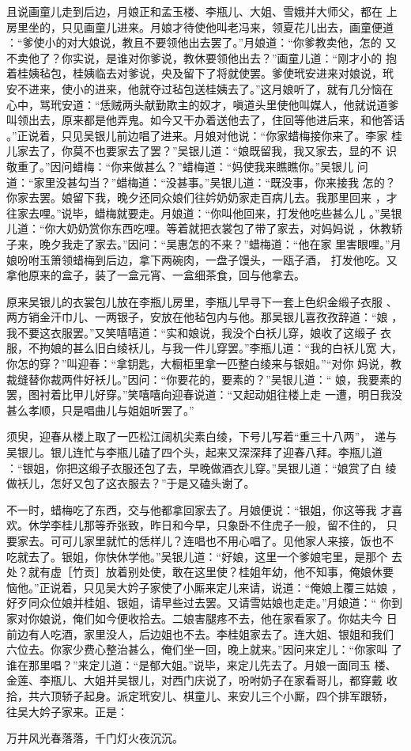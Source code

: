 且说画童儿走到后边，月娘正和孟玉楼、李瓶儿、大姐、雪娥并大师父，都在
上房里坐的，只见画童儿进来。月娘才待使他叫老冯来，领夏花儿出去，画童便道
：“爹使小的对大娘说，教且不要领他出去罢了。”月娘道：“你爹教卖他，怎的
又不卖他了？你实说，是谁对你爹说，教休要领他出去？”画童儿道：“刚才小的
抱着桂姨毡包，桂姨临去对爹说，央及留下了将就使罢。爹使玳安进来对娘说，玳
安不进来，使小的进来，他就夺过毡包送桂姨去了。”这月娘听了，就有几分恼在
心中，骂玳安道：“恁贼两头献勤欺主的奴才，嗔道头里使他叫媒人，他就说道爹
叫领出去，原来都是他弄鬼。如今又干办着送他去了，住回等他进后来，和他答话
。”正说着，只见吴银儿前边唱了进来。月娘对他说：“你家蜡梅接你来了。李家
桂儿家去了，你莫不也要家去了罢？”吴银儿道：“娘既留我，我又家去，显的不
识敬重了。”因问蜡梅：“你来做甚么？”蜡梅道：“妈使我来瞧瞧你。”吴银儿
问道：“家里没甚勾当？”蜡梅道：“没甚事。”吴银儿道：“既没事，你来接我
怎的？你家去罢。娘留下我，晚夕还同众娘们往妗奶奶家走百病儿去。我那里回来
，才往家去哩。”说毕，蜡梅就要走。月娘道：“你叫他回来，打发他吃些甚么儿
。”吴银儿道：“你大奶奶赏你东西吃哩。等着就把衣裳包了带了家去，对妈妈说
，休教轿子来，晚夕我走了家去。”因问：“吴惠怎的不来？”蜡梅道：“他在家
里害眼哩。”月娘吩咐玉箫领蜡梅到后边，拿下两碗肉，一盘子馒头，一瓯子酒，
打发他吃。又拿他原来的盒子，装了一盒元宵、一盒细茶食，回与他拿去。

原来吴银儿的衣裳包儿放在李瓶儿房里，李瓶儿早寻下一套上色织金缎子衣服
、两方销金汗巾儿、一两银子，安放在他毡包内与他。那吴银儿喜孜孜辞道：“娘
，我不要这衣服罢。”又笑嘻嘻道：“实和娘说，我没个白袄儿穿，娘收了这缎子
衣服，不拘娘的甚么旧白绫袄儿，与我一件儿穿罢。”李瓶儿道：“我的白袄儿宽
大，你怎的穿？”叫迎春：“拿钥匙，大橱柜里拿一匹整白绫来与银姐。”“对你
妈说，教裁缝替你裁两件好袄儿。”因问：“你要花的，要素的？”吴银儿道：“
娘，我要素的罢，图衬着比甲儿好穿。”笑嘻嘻向迎春说道：“又起动姐往楼上走
一遭，明日我没甚么孝顺，只是唱曲儿与姐姐听罢了。”

须臾，迎春从楼上取了一匹松江阔机尖素白绫，下号儿写着“重三十八两”，
递与吴银儿。银儿连忙与李瓶儿磕了四个头，起来又深深拜了迎春八拜。李瓶儿道
：“银姐，你把这缎子衣服还包了去，早晚做酒衣儿穿。”吴银儿道：“娘赏了白
绫做袄儿，怎好又包了这衣服去？”于是又磕头谢了。

不一时，蜡梅吃了东西，交与他都拿回家去了。月娘便说：“银姐，你这等我
才喜欢。休学李桂儿那等乔张致，昨日和今早，只象卧不住虎子一般，留不住的，
只要家去。可可儿家里就忙的恁样儿？连唱也不用心唱了。见他家人来接，饭也不
吃就去了。银姐，你快休学他。”吴银儿道：“好娘，这里一个爹娘宅里，是那个
去处？就有虚［竹贡］放着别处使，敢在这里使？桂姐年幼，他不知事，俺娘休要
恼他。”正说着，只见吴大妗子家使了小厮来定儿来请，说道：“俺娘上覆三姑娘
，好歹同众位娘并桂姐、银姐，请早些过去罢。又请雪姑娘也走走。”月娘道：“
你到家对你娘说，俺们如今便收拾去。二娘害腿疼不去，他在家看家了。你姑夫今
日前边有人吃酒，家里没人，后边姐也不去。李桂姐家去了。连大姐、银姐和我们
六位去。你家少费心整治甚么，俺们坐一回，晚上就来。”因问来定儿：“你家叫
了谁在那里唱？”来定儿道：“是郁大姐。”说毕，来定儿先去了。月娘一面同玉
楼、金莲、李瓶儿、大姐并吴银儿，对西门庆说了，吩咐奶子在家看哥儿，都穿戴
收拾，共六顶轿子起身。派定玳安儿、棋童儿、来安儿三个小厮，四个排军跟轿，
往吴大妗子家来。正是：

万井风光春落落，千门灯火夜沉沉。